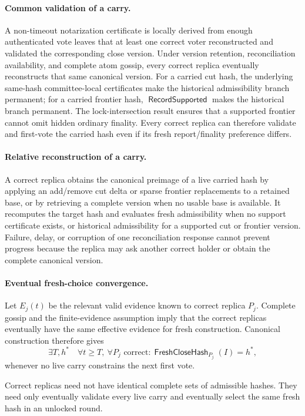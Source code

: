 \documentclass[sigplan,twocolumn,review,anonymous]{acmart}
\newcommand{\func}[1]{\operatorname{\mathsf{#1}}}
\newcommand{\FreshCloseHash}{\func{FreshCloseHash}}
\newcommand{\RecordSupported}{\func{RecordSupported}}
\begin{document}
\paragraph{Common validation of a carry.}
A non-timeout notarization certificate is locally derived from enough authenticated vote leaves that at least one
correct voter reconstructed and validated the corresponding close version.  Under version
retention, reconciliation availability, and complete atom gossip, every correct replica eventually
reconstructs that same canonical version.  For a carried cut hash, the underlying same-hash committee-local certificates make the historical
admissibility branch permanent; for a carried frontier hash, \(\RecordSupported\) makes the historical
branch permanent.  The lock-intersection result ensures that a supported frontier cannot omit hidden
ordinary finality.  Every correct replica can therefore validate and first-vote the carried hash even if
its fresh report/finality preference differs.

\paragraph{Relative reconstruction of a carry.}
A correct replica obtains the canonical preimage of a live carried hash by applying an add/remove cut
delta or sparse frontier replacements to a retained base, or by retrieving a complete version when no
usable base is available.  It recomputes the target hash and evaluates fresh admissibility when no
support certificate exists, or historical admissibility for a supported cut or frontier version.  Failure, delay, or corruption of one reconciliation response cannot prevent
progress because the replica may ask another correct holder or obtain the complete canonical version.

\paragraph{Eventual fresh-choice convergence.}
Let \(E_j(t)\) be the relevant valid evidence known to correct replica \(P_j\).  Complete gossip and
the finite-evidence assumption imply that the correct replicas eventually have the same effective
evidence for fresh construction.  Canonical construction therefore gives
\[
\exists T,h^\ast\quad
\forall t\ge T,\ \forall P_j\text{ correct}:
\FreshCloseHash_{P_j}(I)=h^\ast,
\]
whenever no live carry constrains the next first vote.

Correct replicas need not have identical complete sets of admissible hashes.  They need only
eventually validate every live carry and eventually select the same fresh hash in an unlocked round.
\end{document}
